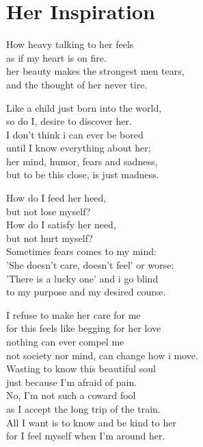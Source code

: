 \documentclass[14pt, a4paper]{memoir}
\begin{document}
\section*{\centering Her Inspiration}\vspace{1cm}

How heavy talking to her feels\\
as if my heart is on fire. \\
her beauty makes the strongest men tears,\\
and the thought of her never tire.\bigbreak

Like a child just born into the world,\\
so do I, desire to discover her.\\
I don't think i can ever be bored \\
until I know everything about her;\\
her mind, humor, fears and sadness,\\
but to be this close, is just madness.\bigbreak

How do I feed her heed,\\
but not lose myself?\\
How do I satisfy her need, \\
but not hurt myself?\\
Sometimes fears comes to my mind:\\
'She doesn't care, doesn't feel' or worse:\\
'There is a lucky one' and i go blind\\
to my purpose and my desired course.\bigbreak

I refuse to make her care for me\\
for this feels like begging for her love\\
nothing can ever compel me\\
not society nor mind, can change how i move.\\
Wasting to know this beautiful soul\\
just because I'm afraid of pain.\\
No, I'm not such a coward fool\\
as I accept the long trip of the train.\\
All I want is to know and be kind to her \\
for I feel myself  when I'm around her.
\end{document}

